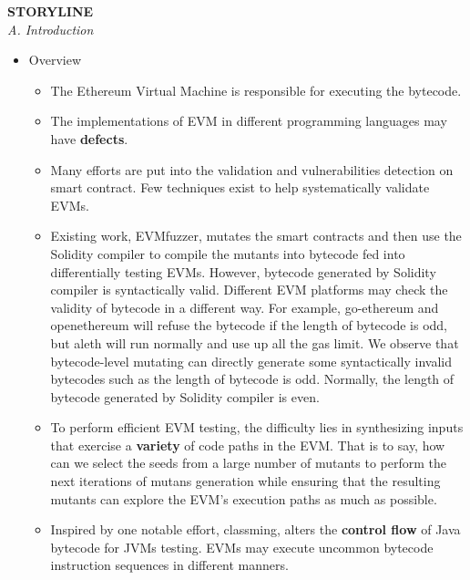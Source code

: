 \documentclass[a4paper]{article}
\begin{document}
		\textbf{STORYLINE}\\
	\textit{A. Introduction}
	\begin{itemize}
		\item Overview
		\begin{itemize}
			\item The Ethereum Virtual Machine is responsible for executing the bytecode.
			\item The implementations of EVM in different programming languages may have \textbf{defects}.
			\item Many efforts are put into the validation and vulnerabilities detection on smart contract. Few techniques exist to help systematically validate EVMs. 
			\item Existing work, EVMfuzzer, mutates the smart contracts and then use the Solidity compiler to compile the mutants into bytecode fed into differentially testing EVMs. However, bytecode generated by Solidity compiler is syntactically valid. Different EVM platforms may check the validity of bytecode in a different way. For example, go-ethereum and openethereum will refuse the bytecode if the length of bytecode is odd, but aleth will run normally and use up all the gas limit. We observe that bytecode-level mutating can directly generate some syntactically invalid bytecodes such as the length of bytecode is odd. Normally, the length of bytecode generated by Solidity compiler is even.
			
			\item To perform
			efficient EVM testing, the difficulty lies in synthesizing inputs that exercise a \textbf{variety} of code paths in the EVM. That is to say, how can we select the seeds from a large number of mutants to perform the next iterations of mutans generation while ensuring that the resulting mutants can explore the EVM's execution paths as much as possible.
			
			\item Inspired by one notable effort, classming, alters the \textbf{control flow} of Java bytecode for JVMs testing. EVMs may execute uncommon
			bytecode instruction sequences in different manners.


\end{itemize}
\end{itemize}
\end{document}

